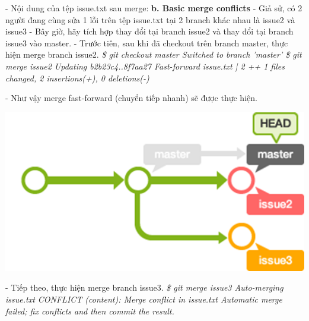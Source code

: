 \documentclass[12pt,a4paper]{report}
\begin{document}
	\label{fig:screenshot062}
	\vskip 0.4cm	\vskip 0.4cm
- Nội dung của tệp issue.txt sau merge:	\vskip 0.4cm
\hspace{1cm}{\it''Đây là nội dung gốc}	\vskip 0.1cm
\hspace{1cm}{\it Đây là nội dung chỉnh sửa''}	\vskip 0.4cm
{\bf b. Basic merge conflicts}	\vskip 0.4cm
- Giả sử, có 2 người đang cùng sửa 1 lỗi trên tệp issue.txt tại 2 branch khác nhau là issue2 và issue3	\vskip 0.4cm
- Bây giờ, hãy tích hợp thay đổi tại branch issue2 và thay đổi tại branch issue3 vào master.	\vskip 0.4cm
- Trước tiên, sau khi đã checkout trên branch master, thực hiện merge branch issue2.	\vskip 0.4cm
{\it \hspace{1cm}\$ git checkout master	\vskip 0.1cm
\hspace{1cm}Switched to branch 'master'	\vskip 0.1cm
\hspace{1cm}\$ git merge issue2	\vskip 0.1cm
\hspace{1cm}Updating b2b23c4..8f7aa27	\vskip 0.1cm
\hspace{1cm}Fast-forward	\vskip 0.1cm
\hspace{1cm}issue.txt |    2 ++	\vskip 0.1cm
\hspace{1cm}1 files changed, 2 insertions(+), 0 deletions(-)}	\vskip 0.4cm

- Như vậy merge fast-forward (chuyển tiếp nhanh) sẽ được thực hiện.	\vskip 0.4cm

	\includegraphics[width=0.8\linewidth]{screenshot063}

	\label{fig:screenshot063}
	\vskip 0.4cm	\vskip 0.4cm
- Tiếp theo, thực hiện merge branch issue3.	\vskip 0.4cm
{\it \hspace{1cm}\$ git merge issue3	\vskip 0.1cm
\hspace{1cm}Auto-merging issue.txt	\vskip 0.1cm
\hspace{1cm}CONFLICT (content): Merge conflict in issue.txt	\vskip 0.1cm
\hspace{1cm}Automatic merge failed; fix conflicts and then commit the result.}	\vskip 0.4cm
\end{document}
